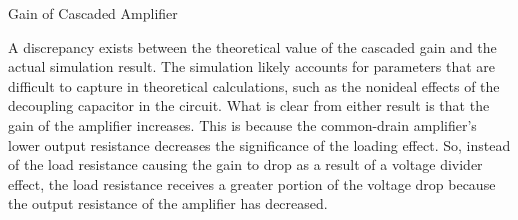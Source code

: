 \FloatBarrier

\begin{table}[h!]
	\centering
	\caption{Gain of Cascaded Amplifier}
	\label{tab:cascade_gain}
\end{table}

\FloatBarrier

A discrepancy exists between the theoretical value of the cascaded gain and the actual simulation result.
The simulation likely accounts for parameters that are difficult to capture in theoretical calculations, such as the nonideal effects of the decoupling capacitor in the circuit.
What is clear from either result is that the gain of the amplifier increases.
This is because the common-drain amplifier's lower output resistance decreases the significance of the loading effect.
So, instead of the load resistance causing the gain to drop as a result of a voltage divider effect, the load resistance receives a greater portion of the voltage drop because the output resistance of the amplifier has decreased.
